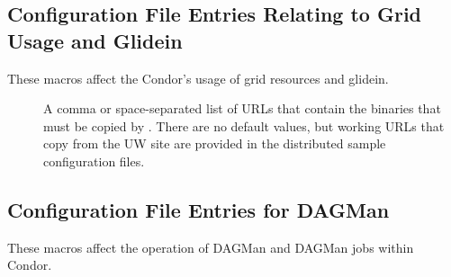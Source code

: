 \subsection{\label{sec:Grid-Config-File-Entries}Configuration File
Entries Relating to Grid Usage and Glidein}

These macros affect the Condor's usage of grid resources
and glidein.
\begin{description}
\item[]
  \label{param:GlideinServerURLS}
  A comma or space-separated list of URLs that contain the binaries
  that must be copied by .
  There are no default values, but working URLs that copy from the UW site
  are provided in the distributed sample configuration files.

\end{description}

\subsection{\label{sec:DAGMan-Config-File-Entries}Configuration File 
Entries for DAGMan}

These macros affect the operation of DAGMan and DAGMan
jobs within Condor.

